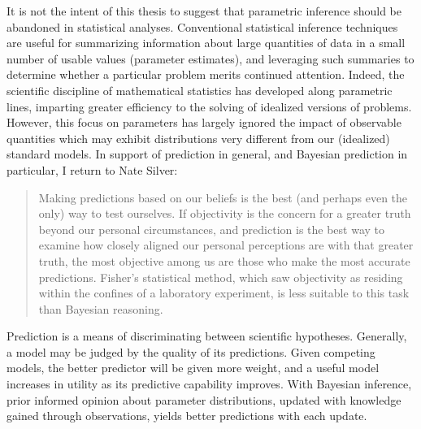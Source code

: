 \documentclass[12pt, a4paper]{article}
\begin{document}
\noindent It is not the intent of this thesis to suggest that parametric inference should be abandoned in statistical analyses.  Conventional statistical inference techniques are useful for summarizing information about large quantities of data in a small number of usable values (parameter estimates), and leveraging such summaries to determine whether a particular problem merits continued attention. Indeed, the scientific discipline of mathematical statistics has developed along parametric lines, imparting greater efficiency to the solving of idealized versions of problems. However, this focus on parameters has largely ignored the impact of observable quantities which may exhibit distributions very different from our (idealized) standard models. In support of prediction in general, and Bayesian prediction in particular, I return to Nate Silver:\\

\begin{quote}
Making predictions based on our beliefs is the best (and perhaps even the only) way to test ourselves. If objectivity is the concern for a greater truth beyond our personal circumstances, and prediction is the best way to examine how closely aligned our personal perceptions are with that greater truth, the most objective among us are those who make the most accurate predictions. Fisher’s statistical method, which saw objectivity as residing within the confines of a laboratory experiment, is less suitable to this task than Bayesian reasoning.
\end{quote}



\noindent Prediction is a means of discriminating between scientific hypotheses. Generally, a model may be judged by the quality of its predictions.  Given competing models, the better predictor will be given more weight, and a useful model increases in utility as its predictive capability improves.  With Bayesian inference, prior informed opinion about parameter distributions, updated with knowledge gained through observations, yields better predictions with each update.\\
\end{document}
